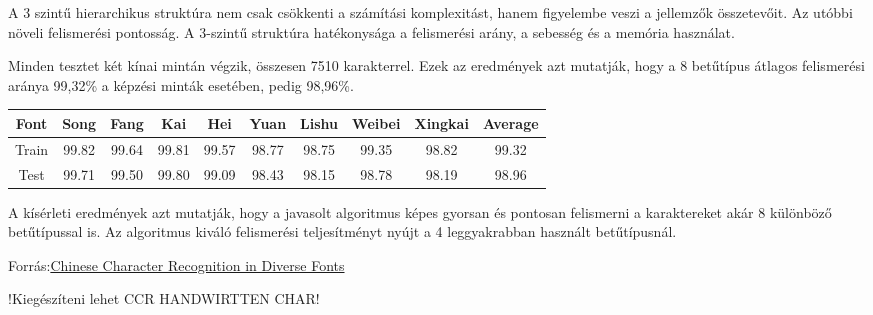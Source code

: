 A 3 szintű hierarchikus struktúra nem csak csökkenti a számítási komplexitást, hanem figyelembe veszi a jellemzők összetevőit. Az utóbbi növeli felismerési pontosság. A 3-szintű struktúra hatékonysága a felismerési arány, a sebesség és a memória használat.

Minden tesztet két kínai mintán végzik, összesen 7510 karakterrel. Ezek az eredmények azt mutatják, hogy a 8 betűtípus átlagos felismerési aránya 99,32\% a képzési minták esetében, pedig 98,96\%.

\begin{center}
\begin{tabular}{ |c|c|c|c|c|c|c|c|c|c|}
\hline
Font & Song & Fang & Kai & Hei & Yuan & Lishu & Weibei & Xingkai & Average\\
\hline
Train & 99.82 & 99.64 & 99.81 & 99.57 & 98.77 & 98.75 & 99.35 & 98.82 & 99.32\\
\hline
Test & 99.71 & 99.50 & 99.80 & 99.09 & 98.43 & 98.15 & 98.78 & 98.19 & 98.96\\
\hline
\end{tabular}
\end{center}

A kísérleti eredmények azt mutatják, hogy a javasolt algoritmus képes gyorsan és pontosan felismerni a karaktereket akár 8 különböző betűtípussal is. Az algoritmus kiváló felismerési teljesítményt nyújt a 4 leggyakrabban használt betűtípusnál.

Forrás:\href{http://citeseerx.ist.psu.edu/viewdoc/download?doi=10.1.1.93.64&rep=rep1&type=pdf}{Chinese Character Recognition in Diverse Fonts}

!Kiegészíteni lehet CCR HANDWIRTTEN CHAR!

